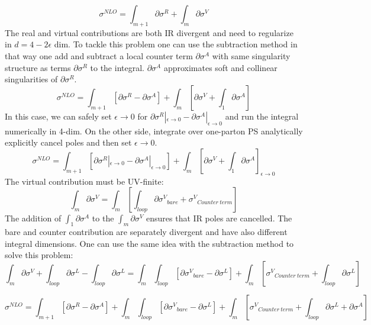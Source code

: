 \begin{equation}
\sigma^{NLO} = \int_{m+1} \partial \sigma^R +\int_{m} \partial \sigma^V
\end{equation}
The real and virtual contributions are both IR divergent and need to regularize in $ d = 4-2\epsilon $ dim.
To tackle this problem one can use the subtraction method in that way one add and subtract a local counter term $ \partial \sigma^A $ with same singularity structure as terms $ \partial \sigma^R $ to the integral. $ \partial \sigma^A $ approximates soft and collinear singularities of $ \partial \sigma^R  $.
\begin{equation}
\sigma^{NLO} = \int_{m+1} [\partial \sigma^R -\partial \sigma^A]+\int_{m} [\partial \sigma^V+\int_1 \partial \sigma^A]
\end{equation}
In this case, we can safely set $ \epsilon \rightarrow 0 $ for $ \partial \sigma^R |_{\epsilon \rightarrow 0}  -\partial \sigma^A |_{\epsilon \rightarrow 0} $ and run the integral numerically in 4-dim. On the other side, integrate over one-parton PS analytically
explicitly cancel poles and then set $ \epsilon \rightarrow 0 $.
\begin{equation}
\sigma^{NLO} = \int_{m+1} [\partial \sigma^R |_{\epsilon \rightarrow 0}  -\partial \sigma^A |_{\epsilon \rightarrow 0}]+\int_{m} [\partial \sigma^V+\int_1 \partial \sigma^A]_{\epsilon \rightarrow 0}
\end{equation}
The virtual contribution must be UV-finite:
\begin{equation}
\int_{m} \partial \sigma^V= \int_m [\int_{loop} \partial {\sigma^V}_{bare} + {\sigma^V}_{Counter\:term}]
\end{equation}
The addition of $\int_1 \partial \sigma^A$ to the $ \int_{m} \partial \sigma^V $ ensures that IR poles are cancelled.
The bare and counter contribution are separately divergent and have also different integral dimensions. One can use the same idea with the subtraction method to solve this problem:
\begin{equation}
\int_{m} \partial \sigma^V +\int_{loop} \partial {\sigma^L}-\int_{loop} \partial {\sigma^L}= \int_m \int_{loop}[ \partial {\sigma^V}_{bare}- \partial {\sigma^L}] + \int_m[{\sigma^V}_{Counter\:term}+ \int_{loop} \partial {\sigma^L}]
\end{equation}


\begin{equation}
\sigma^{NLO} = \int_{m+1} [\partial \sigma^R -\partial \sigma^A]+ \int_m \int_{loop}[ \partial {\sigma^V}_{bare}- \partial {\sigma^L}] + \int_m[{\sigma^V}_{Counter\:term}+ \int_{loop} \partial {\sigma^L}+\partial \sigma^A]
\end{equation}

